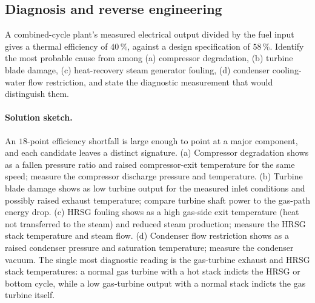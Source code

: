 \subsection*{Diagnosis and reverse engineering}

\begin{exercise}
A combined-cycle plant's measured electrical output divided by the
fuel input gives a thermal efficiency of $40\,\%$, against a design
specification of $58\,\%$. Identify the most probable cause from
among (a) compressor degradation, (b) turbine blade damage, (c)
heat-recovery steam generator fouling, (d) condenser cooling-water
flow restriction, and state the diagnostic measurement that would
distinguish them.

\paragraph{Solution sketch.} An $18$-point efficiency shortfall is large
enough to point at a major component, and each candidate leaves a
distinct signature. (a) Compressor degradation shows as a fallen
pressure ratio and raised compressor-exit temperature for the same speed;
measure the compressor discharge pressure and temperature. (b) Turbine
blade damage shows as low turbine output for the measured inlet
conditions and possibly raised exhaust temperature; compare turbine
shaft power to the gas-path energy drop. (c) HRSG fouling shows as a
high gas-side exit temperature (heat not transferred to the steam) and
reduced steam production; measure the HRSG stack temperature and steam
flow. (d) Condenser flow restriction shows as a raised condenser
pressure and saturation temperature; measure the condenser vacuum. The
single most diagnostic reading is the gas-turbine exhaust and HRSG stack
temperatures: a normal gas turbine with a hot stack indicts the HRSG or
bottom cycle, while a low gas-turbine output with a normal stack indicts
the gas turbine itself.
\end{exercise}

